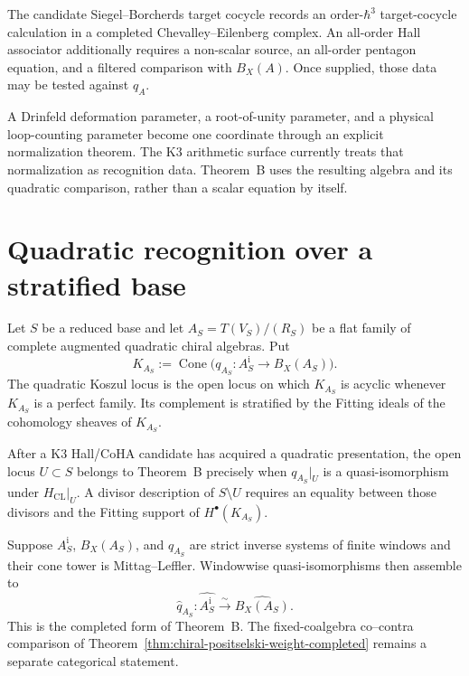 \begin{remark}
\label{rem:tbsp-etingof-2}
The candidate Siegel--Borcherds target cocycle records an
order-\(\hbar^3\) target-cocycle calculation in a completed
Chevalley--Eilenberg complex.  An all-order Hall associator
additionally requires a non-scalar source, an all-order pentagon
equation, and a filtered comparison with
\(B_X(A)\).  Once supplied, those data may be tested against
\(q_A\).
\end{remark}

\begin{remark}
\label{rem:tbsp-etingof-3}
A Drinfeld deformation parameter, a root-of-unity parameter, and a
physical loop-counting parameter become one coordinate through an
explicit normalization theorem.  The K3 arithmetic surface
currently treats that normalization as recognition data.  Theorem~B
uses the resulting algebra and its quadratic comparison, rather than
a scalar equation by itself.
\end{remark}

\section{Quadratic recognition over a stratified base}
\label{sec:tbsp-supplement-ii}

Let \(S\) be a reduced base and let \(A_S=T(V_S)/(R_S)\) be a flat
family of complete augmented quadratic chiral algebras.  Put
\[
 K_{A_S}:=\operatorname{Cone}
 \bigl(q_{A_S}\colon A_S^{\mathrm i}\to B_X(A_S)\bigr).
\]
The quadratic Koszul locus is the open locus on which \(K_{A_S}\) is
acyclic whenever \(K_{A_S}\) is a perfect family.  Its complement is
stratified by the Fitting ideals of the cohomology sheaves of
\(K_{A_S}\).

\begin{remark}
\label{rem:tbsp-1}
After a K3 Hall/CoHA candidate has acquired a quadratic presentation,
the open locus \(U\subset S\) belongs to Theorem~B precisely when
\(q_{A_S}|_U\) is a quasi-isomorphism under
\(H_{\mathrm{CL}}|_U\).  A divisor description of \(S\setminus U\)
requires an equality between those divisors and the Fitting support
of \(H^\bullet(K_{A_S})\).
\end{remark}

\begin{remark}
\label{rem:tbsp-2}
Suppose \(A_S^{\mathrm i}\), \(B_X(A_S)\), and \(q_{A_S}\) are strict
inverse systems of finite windows and their cone tower is
Mittag--Leffler.  Windowwise quasi-isomorphisms then assemble to
\[
 \widehat q_{A_S}\colon
 \widehat{A_S^{\mathrm i}}\xrightarrow{\sim}\widehat{B_X(A_S)}.
\]
This is the completed form of Theorem~B.  The fixed-coalgebra
co--contra comparison of
Theorem~\ref{thm:chiral-positselski-weight-completed} remains a
separate categorical statement.
\end{remark}

